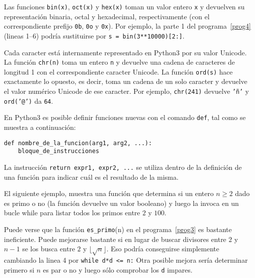 \documentclass[a4paper, 11pt]{article}
\theoremstyle{plain}
\theoremstyle{definition}
\begin{document}
Las funciones \texttt{bin(x)}, \texttt{oct(x)} y \texttt{hex(x)} toman un valor
entero \texttt{x} y devuelven su representación binaria, octal y hexadecimal, 
respectivamente (con el correspondiente prefijo \texttt{0b}, \texttt{0o} y
\texttt{0x}). Por ejemplo, la parte 1 del programa~\ref{prog4} (lineas 1--6)
podría sustituirse por \texttt{s = bin(3**10000)[2:]}.

\bigskip

Cada caracter está internamente representado en Python3 por su valor Unicode.
La función \texttt{chr(n)} toma un entero \texttt{n} y devuelve una cadena de
caracteres de longitud 1 con el correspondiente caracter Unicode. La función
\texttt{ord(s)} hace exactamente lo opuesto, es decir, toma un cadena de un
solo caracter y devuelve el valor numérico Unicode de ese caracter. Por ejemplo,
\texttt{chr(241)} devuelve \texttt{'ñ'} y \texttt{ord('@')} da \texttt{64}.

\bigskip

En Python3 es posible definir funciones nuevas con el comando \texttt{def}, tal
como se muestra a continuación:

\begin{lstlisting}
def nombre_de_la_funcion(arg1, arg2, ...):
    bloque_de_instrucciones
\end{lstlisting}

\bigskip

La instrucción \texttt{return expr1, expr2, ...} se utiliza dentro de la definición
de una función para indicar cuál es el resultado de la misma.

\bigskip

El siguiente ejemplo, muestra una función que determina si un entero $n\geq 2$ dado
es primo o no (la función devuelve un valor booleano) y luego la invoca en un bucle
while para listar todos los primos entre $2$ y $100$.



\bigskip

Puede verse que la función \texttt{es\_primo}(n) en el programa~\ref{prog3} es
bastante ineficiente. Puede mejorarse bastante si en lugar de buscar
divisores entre $2$ y $n-1$ se los busca entre $2$ y $\lfloor\sqrt{n}\rfloor$.
Eso podría conseguirse simplemente cambiando la linea 4 por
\texttt{while d*d <= n:}
Otra posible mejora sería determinar primero si $n$ es par o no y luego
sólo comprobar los \texttt{d} impares.
\end{document}
